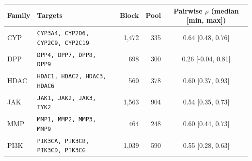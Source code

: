 \begin{tabular}{llrrc}
\toprule
Family & Targets & Block & Pool & Pairwise $\rho$ (median [min, max]) \\
\midrule
CYP & \texttt{CYP3A4, CYP2D6, CYP2C9, CYP2C19} & 1,472 & 335 & 0.64 [0.48, 0.76] \\
DPP & \texttt{DPP4, DPP7, DPP8, DPP9} & 698 & 300 & 0.26 [-0.04, 0.81] \\
HDAC & \texttt{HDAC1, HDAC2, HDAC3, HDAC6} & 560 & 378 & 0.60 [0.37, 0.93] \\
JAK & \texttt{JAK1, JAK2, JAK3, TYK2} & 1,563 & 904 & 0.54 [0.35, 0.73] \\
MMP & \texttt{MMP1, MMP2, MMP3, MMP9} & 464 & 248 & 0.60 [0.44, 0.73] \\
PI3K & \texttt{PIK3CA, PIK3CB, PIK3CD, PIK3CG} & 1,039 & 590 & 0.55 [0.28, 0.63] \\
\bottomrule
\end{tabular}
